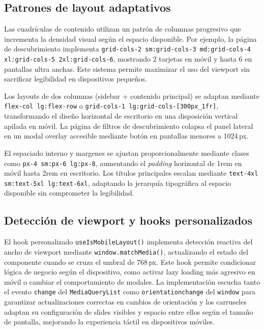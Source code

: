 \subsection{Patrones de layout adaptativos}

Las cuadrículas de contenido utilizan un patrón de columnas progresivo que incrementa la densidad visual según el espacio disponible. Por ejemplo, la página de descubrimiento implementa \texttt{grid-cols-2 sm:grid-cols-3 md:grid-cols-4 xl:grid-cols-5 2xl:grid-cols-6}, mostrando 2 tarjetas en móvil y hasta 6 en pantallas ultra anchas. Este sistema permite maximizar el uso del viewport sin sacrificar legibilidad en dispositivos pequeños.

Los layouts de dos columnas (sidebar + contenido principal) se adaptan mediante \texttt{flex-col lg:flex-row} o \texttt{grid-cols-1 lg:grid-cols-[300px\_1fr]}, transformando el diseño horizontal de escritorio en una disposición vertical apilada en móvil. La página de filtros de descubrimiento colapsa el panel lateral en un modal overlay accesible mediante botón en pantallas menores a 1024\,px.

El espaciado interno y margenes se ajustan proporcionalmente mediante clases como \texttt{px-4 sm:px-6 lg:px-8}, aumentando el \textit{padding} horizontal de 1rem en móvil hasta 2rem en escritorio. Los títulos principales escalan mediante \texttt{text-4xl sm:text-5xl lg:text-6xl}, adaptando la jerarquía tipográfica al espacio disponible sin comprometer la legibilidad.

\subsection{Detección de viewport y hooks personalizados}

El hook personalizado \texttt{useIsMobileLayout()} implementa detección reactiva del ancho de viewport mediante \texttt{window.matchMedia()}, actualizando el estado del componente cuando se cruza el umbral de 768\,px. Este hook permite condicionar lógica de negocio según el dispositivo, como activar lazy loading más agresivo en móvil o cambiar el comportamiento de modales. La implementación escucha tanto el evento \texttt{change} del \texttt{MediaQueryList} como \texttt{orientationchange} del \texttt{window} para garantizar actualizaciones correctas en cambios de orientación y los carruseles adaptan su configuración de slides visibles y espacio entre ellos según el tamaño de pantalla, mejorando la experiencia táctil en dispositivos móviles.

